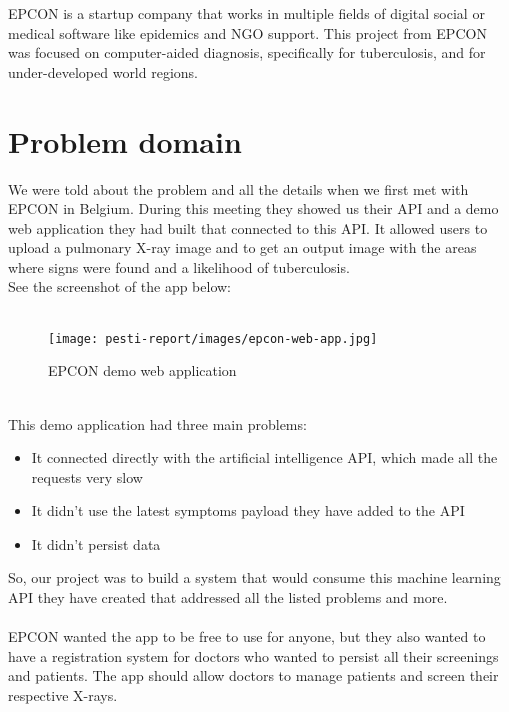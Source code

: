 EPCON is a startup company that works in multiple fields of digital social or medical software like epidemics and NGO support. This project from EPCON was focused on computer-aided diagnosis, specifically for tuberculosis, and for under-developed world regions.

\section{Problem domain}

We were told about the problem and all the details when we first met with EPCON in Belgium. During this meeting they showed us their API and a demo web application they had built that connected to this API. It allowed users to upload a pulmonary X-ray image and to get an output image with the areas where signs were found and a likelihood of tuberculosis. \cite{Biometrics}
\\
See the screenshot of the app below:
\\ \\

\begin{figure}[H]
	\centering
	\texttt{[image: pesti-report/images/epcon-web-app.jpg]}
	\caption{EPCON demo web application}
	\label{fig:epcon-web-app}
\end{figure}

\\

This demo application had three main problems:

\begin{itemize}
\item
It connected directly with the artificial intelligence API, which made all the requests very slow
\item
It didn't use the latest symptoms payload they have added to the API
\item
It didn't persist data
\end{itemize}

So, our project was to build a system that would consume this machine learning API they have created that addressed all the listed problems and more.
\\ \\
EPCON wanted the app to be free to use for anyone, but they also wanted to have a registration system for doctors who wanted to persist all their screenings and patients. The app should allow doctors to manage patients and screen their respective X-rays.

